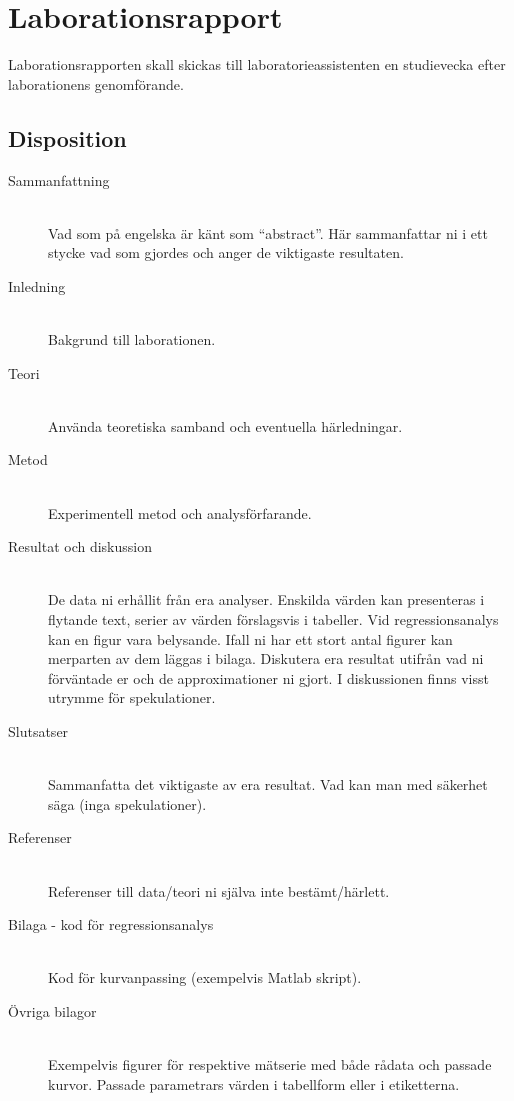 \section{Laborationsrapport}
\label{sec:rapport}
Laborationsrapporten skall skickas till laboratorieassistenten en
studievecka efter laborationens genomförande.

\subsection{Disposition}
\begin{description}
  \item[Sammanfattning] \hfill \\
    Vad som på engelska är känt som ``abstract''. Här sammanfattar ni i
    ett stycke vad som gjordes och anger de viktigaste resultaten.
  \item[Inledning] \hfill \\ 
    Bakgrund till laborationen.
  \item[Teori] \hfill \\ 
    Använda teoretiska samband och eventuella härledningar.
  \item[Metod] \hfill \\ 
    Experimentell metod och analysförfarande.
  \item[Resultat och diskussion] \hfill \\ 
    De data ni erhållit från era analyser. Enskilda värden kan
    presenteras i flytande text, serier av värden förslagsvis i tabeller.
    Vid regressionsanalys kan en figur vara belysande. Ifall ni har
    ett stort antal figurer kan merparten av dem läggas i
    bilaga. Diskutera era resultat utifrån vad ni förväntade er och de
    approximationer ni gjort. I diskussionen finns visst utrymme för
    spekulationer.
  \item[Slutsatser] \hfill \\ 
    Sammanfatta det viktigaste av era resultat. Vad kan man med säkerhet
    säga (inga spekulationer).
  \item[Referenser] \hfill \\
    Referenser till data/teori ni själva inte bestämt/härlett.
  \item[Bilaga - kod för regressionsanalys] \hfill \\
    Kod för kurvanpassing (exempelvis Matlab skript).
  \item[Övriga bilagor] \hfill \\
    Exempelvis figurer för respektive mätserie med både rådata och
    passade kurvor. Passade parametrars värden i tabellform eller i
    etiketterna.
\end{description}

